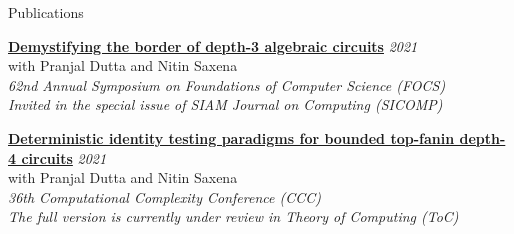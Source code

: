 \documentclass{resume} %
\begin{document}
\begin{rSection}{Publications}
    \item {\bf \href{https://www.prateekdwivedi.in/papers/border-depth3-fullversion.pdf}{Demystifying the border of depth-3 algebraic circuits}} \hfill \emph{2021} \\
    {with Pranjal Dutta and Nitin Saxena}\\
    {\em 62nd Annual Symposium on Foundations of Computer Science (FOCS)  } \\
    {\em\color{highlight}Invited in the special issue of SIAM Journal on Computing (SICOMP) }
    
    \item {\bf \href{https://www.prateekdwivedi.in/papers/pit-depth4-didi-fullversion.pdf}{Deterministic identity testing paradigms for bounded top-fanin depth-4 circuits}} \hfill \emph{2021} \\
    {with Pranjal Dutta and Nitin Saxena}\\
    {\em 36th Computational Complexity Conference (CCC)}\\
    {\em The full version is currently under review in Theory of Computing (ToC)}
    
\end{rSection}

\vspace{1em}

\end{document}
